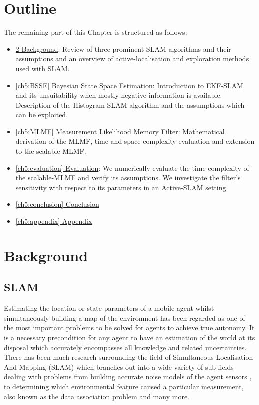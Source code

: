 \section{Outline}


The remaining part of this Chapter is structured as follows:


\begin{itemize}
 \item \hyperref[ch5:background]{\ref{ch5:background} Background}: Review of three prominent SLAM algorithms
 and their assumptions and an overview of active-localisation and exploration methods used with SLAM.
 \item \hyperref[ch5:BSSE]{\ref{ch5:BSSE} Bayesian State Space Estimation}:  Introduction to EKF-SLAM and
 its unsuitability when mostly negative information is available. Description 
 of the Histogram-SLAM algorithm and the assumptions which can be exploited.
 \item \hyperref[ch5:MLMF]{\ref{ch5:MLMF} Measurement Likelihood Memory Filter}:
 Mathematical derivation of the MLMF, time and space complexity evaluation and extension to 
 the scalable-MLMF.
 \item \hyperref[ch5:evaluation]{\ref{ch5:evaluation} Evaluation}:
 We numerically evaluate the time complexity of the scalable-MLMF and verify its assumptions.
 We investigate the filter's sensitivity with respect to its parameters in an Active-SLAM setting.
 \item \hyperref[ch5:conclusion]{\ref{ch5:conclusion} Conclusion}
 \item \hyperref[ch5:appendix]{\ref{ch5:appendix} Appendix}
\end{itemize}

\section{Background}\label{ch5:background}

\subsection{SLAM}

Estimating the location or state parameters of a mobile agent whilst simultaneously building a map of the environment has been
regarded as one of the most important problems to be solved for agents to achieve true autonomy. It is a necessary precondition for 
any agent to have an estimation of the world at its disposal which accurately encompasses all knowledge and related uncertainties. 
There has been much research surrounding the field of Simultaneous Localisation And Mapping (SLAM) which branches out into a wide variety of sub-fields 
dealing with problems from building accurate noise models of the agent sensors \cite{Plagemann07gaussianbeam}, to determining which environmental 
feature caused a particular measurement, also known as the data association problem \cite{DataAssociation2003} and many more. 

